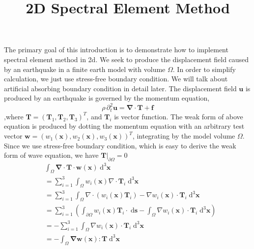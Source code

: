 \documentclass{book}
\title{2D Spectral Element Method}
\begin{document}
  The primary goal of this introduction is to demonstrate how to implement spectral element method in 2d. We seek to produce the displacement field caused by an earthquake in a finite earth model with volume $\Omega$. In order to simplify calculation, we just use stress-free boundary condition.  We will  talk about artificial absorbing  boundary condition in detail later.
  The displacement field $\boldsymbol{u}$ is produced by an earthquake is governed by the momentum equation,
  \begin{equation}
  \rho\,\partial_t^2\boldsymbol{u}=\boldsymbol{\nabla}\cdot\boldsymbol{T}+\boldsymbol{f}
  \end{equation}
  ,where $\boldsymbol T =(\boldsymbol T_1,\boldsymbol T_2,\boldsymbol T_3)^T$, and $\boldsymbol T_i$ is vector function.
  The weak form of above equation is produced by dotting the momentum equation with an arbitrary test vector $\boldsymbol{w}=(w_1(\boldsymbol x),w_2(\boldsymbol x),w_3(\boldsymbol x))^T $, integrating by the model volume $\Omega$. Since we use stress-free boundary condition, which is easy to derive the weak form of wave equation, we have $\boldsymbol T|_{\partial \Omega} = 0$
  \begin{equation}
  \begin{aligned}
  &\int_\Omega \boldsymbol{\nabla}\cdot\boldsymbol{T}\cdot\boldsymbol w(\boldsymbol{x})\;\mathrm{d}^3\boldsymbol{x}\\
  & = \sum _{i=1}^3\int_\Omega w_i(\boldsymbol{x})\nabla\cdot\boldsymbol{T}_i\;\mathrm{d}^3\boldsymbol{x}\\
  & = \sum_{i=1}^3\int_\Omega \nabla\cdot(w_i(\boldsymbol{x})\boldsymbol{T}_i) - \nabla w_i(\boldsymbol x) \cdot\boldsymbol T_i\;\mathrm{d}^3\boldsymbol{x}\\
  & = \sum_{i=1}^3\left(\int_{\partial\Omega} w_i(\boldsymbol{x})\boldsymbol T_i \cdot \;\mathrm{d}\boldsymbol{s}-\int_\Omega\nabla w_i(\boldsymbol x) \cdot\boldsymbol T_i\;\mathrm{d}^3\boldsymbol{x} \right)\\
  & = -\sum_{i=1}^3\int_\Omega\nabla w_i(\boldsymbol x) \cdot\boldsymbol T_i\;\mathrm{d}^3\boldsymbol{x}\\
  & = -\int_\Omega \boldsymbol{\nabla}\boldsymbol w(\boldsymbol x): \boldsymbol T\;\mathrm{d}^3\boldsymbol x
  \end{aligned}
  \end{equation}
\end{document}
